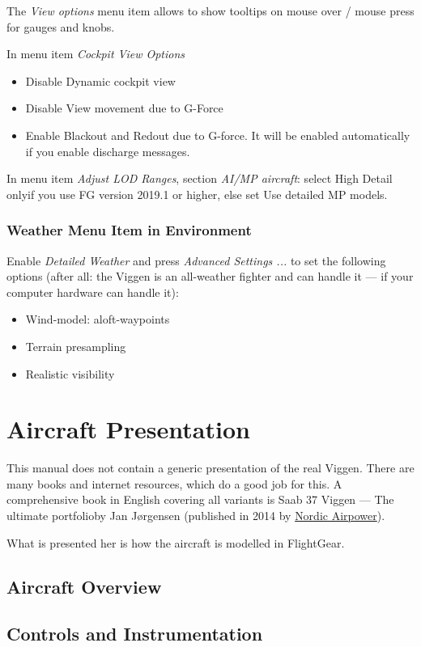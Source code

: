 The \emph{View options} menu item allows to show tooltips on mouse over / mouse press for gauges and knobs.

In menu item \emph{Cockpit View Options}
\begin{itemize}
\item Disable \glqq Dynamic cockpit view \grqq
\item Disable \glqq View movement due to G-Force\grqq
\item Enable \glqq Blackout and Redout due to G-force\grqq. It will be enabled automatically if you enable discharge messages.
\end{itemize}

In menu item \emph{Adjust LOD Ranges}, section \emph{AI/MP aircraft}: select \glqq High Detail only\grqq if you use FG version 2019.1 or higher, else set \glqq Use detailed MP models\grqq.

\section{Weather Menu Item in Environment}
Enable \emph{Detailed Weather} and press \emph{Advanced Settings ...} to set the following options (after all: the Viggen is an all-weather fighter and can handle it --- if your computer hardware can handle it):
\begin{itemize}
\item Wind-model: aloft-waypoints
\item Terrain presampling
\item Realistic visibility
\end{itemize}

\part{Aircraft Presentation}
This manual does not contain a generic presentation of the real Viggen. There are many books and internet resources, which do a good job for this. A comprehensive book in English covering all variants is \glqq Saab 37 Viggen --- The ultimate portfolio\grqq by Jan Jørgensen (published in 2014 by \href{http://www.nordicairpower.com/}{Nordic Airpower}).

What is presented her is how the aircraft is modelled in FlightGear.

\chapter{Aircraft Overview}
\chapter{Controls and Instrumentation}
